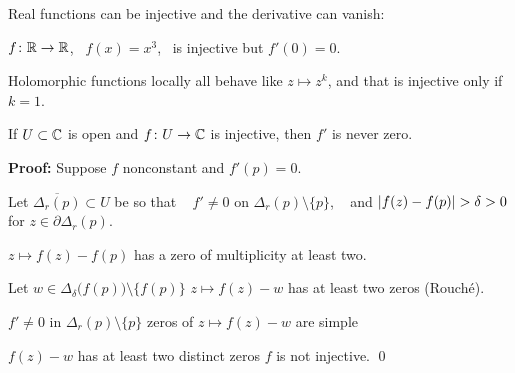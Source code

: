 \documentclass[10pt,aspectratio=169]{beamer}
\begin{document}
\begin{frame}
Real functions can be injective and the derivative can vanish:

$f \colon {\mathbb{R}} \to {\mathbb{R}}$, ~$f(x) = x^3$, ~is injective but $f'(0) = 0$.

\medskip
\pause

Holomorphic functions locally all behave like
$z \mapsto z^k$, and that is injective only if $k=1$.

\medskip
\pause

\begin{lemma}
If $U \subset {\mathbb{C}}$ is open and $f \colon U \to {\mathbb{C}}$ is injective, then
$f'$ is never zero.
\end{lemma}

\pause

\textbf{Proof:}
Suppose $f$ nonconstant and $f'(p) = 0$.

\pause
Let $\overline{\Delta_r(p)} \subset U$
be so that ~ $f' \not= 0$ on $\Delta_r(p) \setminus
\{ p \}$, ~
and $\lvert {f(z)-f(p)} \rvert > \delta > 0$ for $z \in \partial
\Delta_r(p)$.

\medskip
\pause

$z \mapsto f(z) - f(p)$ has a zero of multiplicity at least
two.

\pause
\medskip

Let $w \in \Delta_{\delta}\bigl(f(p)\bigr) \setminus \bigl\{ f(p) \bigr\}$
\pause
\wthus
$z \mapsto f(z)-w$ has at least two zeros (Rouch\'e).

\pause
\medskip

$f'\not=0$ in $\Delta_r(p) \setminus \{ p \}$
\pause
\wthus
zeros of $z \mapsto f(z)-w$ are simple

\pause
\thus \quad
$f(z)-w$ has at least two distinct zeros
\pause
\wthus
$f$ is not injective.  \qed
\end{frame}
\end{document}
